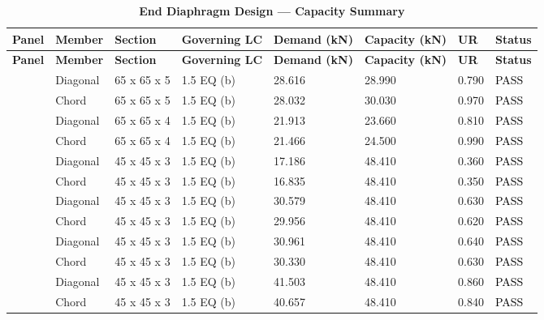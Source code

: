 \documentclass[12pt,a4paper]{report}
\numberwithin{table}{chapter}
\numberwithin{figure}{chapter}
\begin{document}
\begin{longtable}{|C{2.0cm}|L{1.8cm}|C{2.2cm}|C{3.0cm}|C{1.8cm}|C{1.8cm}|C{1.2cm}|C{1.8cm}|}
\caption{\textbf{End Diaphragm Design --- Capacity Summary}}
\hline
\textbf{Panel} & \textbf{Member} & \textbf{Section} & \textbf{Governing LC} & \textbf{Demand (kN)} & \textbf{Capacity (kN)} & \textbf{UR} & \textbf{Status} \\[6pt]
\hline
\endfirsthead
\hline
\textbf{Panel} & \textbf{Member} & \textbf{Section} & \textbf{Governing LC} & \textbf{Demand (kN)} & \textbf{Capacity (kN)} & \textbf{UR} & \textbf{Status} \\[6pt]
\hline
\endhead
{} & Diagonal & 65 x 65 x 5 & 1.5 EQ (b) & 28.616 & 28.990 & 0.790 & \textcolor{black}{PASS} \\[6pt]
 & Chord & 65 x 65 x 5 & 1.5 EQ (b) & 28.032 & 30.030 & 0.970 & \textcolor{black}{PASS} \\[6pt]
\hline
{} & Diagonal & 65 x 65 x 4 & 1.5 EQ (b) & 21.913 & 23.660 & 0.810 & \textcolor{black}{PASS} \\[6pt]
 & Chord & 65 x 65 x 4 & 1.5 EQ (b) & 21.466 & 24.500 & 0.990 & \textcolor{black}{PASS} \\[6pt]
\hline
{} & Diagonal & 45 x 45 x 3 & 1.5 EQ (b) & 17.186 & 48.410 & 0.360 & \textcolor{black}{PASS} \\[6pt]
 & Chord & 45 x 45 x 3 & 1.5 EQ (b) & 16.835 & 48.410 & 0.350 & \textcolor{black}{PASS} \\[6pt]
\hline
{} & Diagonal & 45 x 45 x 3 & 1.5 EQ (b) & 30.579 & 48.410 & 0.630 & \textcolor{black}{PASS} \\[6pt]
 & Chord & 45 x 45 x 3 & 1.5 EQ (b) & 29.956 & 48.410 & 0.620 & \textcolor{black}{PASS} \\[6pt]
\hline
{} & Diagonal & 45 x 45 x 3 & 1.5 EQ (b) & 30.961 & 48.410 & 0.640 & \textcolor{black}{PASS} \\[6pt]
 & Chord & 45 x 45 x 3 & 1.5 EQ (b) & 30.330 & 48.410 & 0.630 & \textcolor{black}{PASS} \\[6pt]
\hline
{} & Diagonal & 45 x 45 x 3 & 1.5 EQ (b) & 41.503 & 48.410 & 0.860 & \textcolor{black}{PASS} \\[6pt]
 & Chord & 45 x 45 x 3 & 1.5 EQ (b) & 40.657 & 48.410 & 0.840 & \textcolor{black}{PASS} \\[6pt]

\end{longtable}
\end{document}
